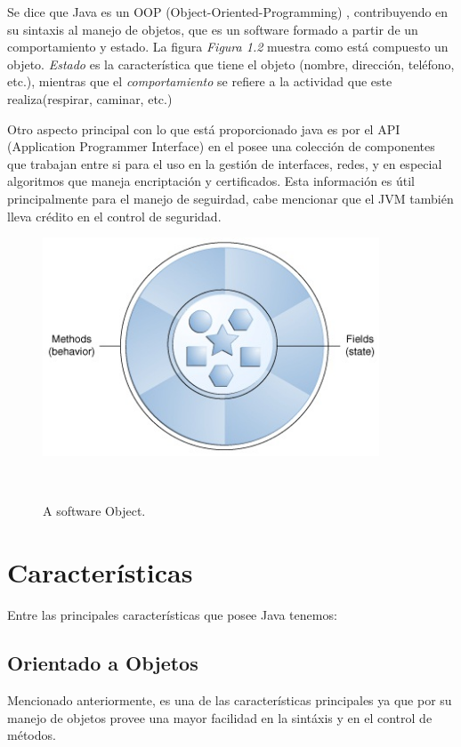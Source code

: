 \documentclass[12pt]{book} %
\begin{document}
Se dice que Java es un OOP (Object-Oriented-Programming) \cite{oop}, contribuyendo en su sintaxis al manejo de objetos, que es un software formado a partir de un comportamiento y estado. La figura \textsl{Figura 1.2} muestra como est\'a compuesto un objeto. \textsl{Estado} es la caracter\'istica que tiene el objeto (nombre, direcci\'on, tel\'efono, etc.), mientras que el \textsl{comportamiento} se refiere a la actividad que este realiza(respirar, caminar, etc.)

Otro aspecto principal con lo que est\'a proporcionado java es por el API (Application Programmer Interface) en el posee una colecci\'on de componentes que trabajan entre si para el uso en la gesti\'on de interfaces, redes, y en especial algoritmos que maneja encriptaci\'on y certificados. Esta informaci\'on es \'util principalmente para el manejo de seguirdad, cabe mencionar que el JVM tambi\'en lleva cr\'edito en el control de seguridad.

\begin{figure}[h!]
		\centering
			\includegraphics[width=10cm]{conceptsobject.jpg}
			\caption{A software Object.}~\\[1.4cm]
		
\end{figure}


\chapter{Características}
Entre las principales caracter\'isticas que posee Java tenemos:

\section{Orientado a Objetos}
Mencionado anteriormente, es una de las caracter\'isticas principales ya que por su manejo de objetos provee una mayor facilidad en la sint\'axis y en el control de m\'etodos.
\end{document}
